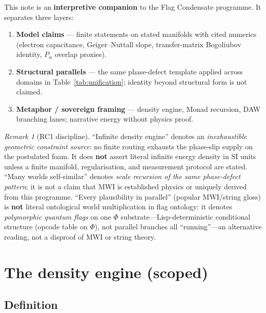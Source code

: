 \documentclass[11pt,a4paper]{article}
\theoremstyle{remark}
\newtheorem*{remark}{Remark}
\theoremstyle{definition}
\begin{document}
This note is an \textbf{interpretive companion} to the Flag Condensate
programme.  It separates three layers:

\begin{enumerate}[leftmargin=1.5em,itemsep=2pt]
  \item \textbf{Model claims} --- finite statements on stated manifolds with
        cited numerics (electron capacitance, Geiger--Nuttall slope,
        transfer-matrix Bogoliubov identity, $P_\alpha$ overlap proxies).
  \item \textbf{Structural parallels} --- the same phase-defect template
        applied across domains in Table~\ref{tab:unification}; identity beyond
        structural form is not claimed.
  \item \textbf{Metaphor / sovereign framing} --- density engine, Monad
        recursion, DAW branching lanes; narrative energy without physics proof.
\end{enumerate}

\begin{remark}[RC1 discipline]
``Infinite density engine'' denotes an \emph{inexhaustible geometric constraint
source}: no finite routing exhausts the phase-slip supply on the postulated
foam.  It does \textbf{not} assert literal infinite energy density in SI units
unless a finite manifold, regularisation, and measurement protocol are stated.
``Many worlds self-similar'' denotes \emph{scale recursion of the same
phase-defect pattern}; it is not a claim that MWI is established physics or
uniquely derived from this programme.  ``Every plausibility in parallel'' (popular
MWI/string gloss) is \textbf{not} literal ontological world multiplication in
flag ontology: it denotes \emph{polymorphic quantum flags} on one $\Phi$
substrate---Lisp-deterministic conditional structure (opcode table on
$\Phi$), not parallel branches all ``running''---an alternative reading,
not a disproof of MWI or string theory.
\end{remark}

\section{The density engine (scoped)}
\label{sec:density}

\subsection{Definition}
\end{document}
